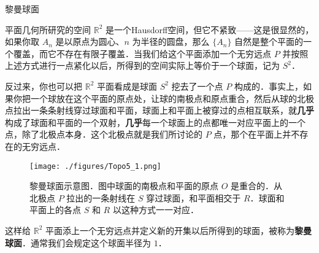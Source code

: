 \begin{example}{黎曼球面}

平面几何所研究的空间 $\mathbb{R}^2$ 是一个Hausdorff空间，但它不紧致——这是很显然的，如果你取 $A_n$ 是以原点为圆心、$n$ 为半径的圆盘，那么 $\{A_n\}$ 自然是整个平面的一个覆盖，而它不存在有限子覆盖．当我们给这个平面添加一个无穷远点 $P$ 并按照上述方式进行一点紧化以后，所得到的空间实际上等价于一个球面，记为 $S^2$．

反过来，你也可以把 $\mathbb{R}^2$ 平面看成是球面 $S^2$ 挖去了一个点 $P$ 构成的．事实上，如果你把一个球放在这个平面的原点处，让球的南极点和原点重合，然后从球的北极点拉出一条条射线穿过球面和平面，球面上和平面上被穿过的点相互联系，就\textbf{几乎}构成了球面和平面的一个双射，\textbf{几乎}每一个球面上的点都唯一对应平面上的一个点，除了北极点本身．这个北极点就是我们所讨论的 $P$ 点，那个在平面上并不存在的无穷远点．

\begin{figure}[ht]
\centering
\texttt{[image: ./figures/Topo5\_1.png]}
\caption{黎曼球面示意图．图中球面的南极点和平面的原点 $O$ 是重合的．从北极点 $P$ 拉出的一条射线在 $S$ 穿过球面，和平面相交于 $R$．球面和平面上的各点 $S$ 和 $R$ 以这种方式一一对应．} \label{Topo5_fig1}
\end{figure}

这样给 $\mathbb{R}^2$ 平面添上一个无穷远点并定义新的开集以后所得到的球面，被称为\textbf{黎曼球面}．通常我们会规定这个球面半径为 $1$．
\end{example}



